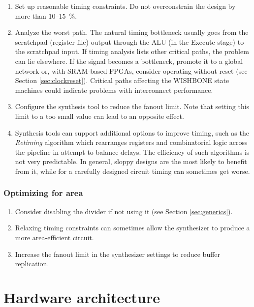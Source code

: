 \documentclass[a4paper,12pt,twoside,extrafontsizes]{memoir}
\begin{document}
\begin{enumerate}
	\item Set up reasonable timing constraints. Do not overconstrain the design by more than 10--15~\%.
	
	\item Analyze the worst path. The natural \lxp{} timing bottleneck usually goes from the scratchpad (register file) output through the ALU (in the Execute stage) to the scratchpad input. If timing analysis lists other critical paths, the problem can lie elsewhere. If the  signal becomes a bottleneck, promote it to a global network or, with SRAM-based FPGAs, consider operating without reset (see Section \ref{sec:clockreset}). Critical paths affecting the WISHBONE state machines could indicate problems with interconnect performance.
	
	\item Configure the synthesis tool to reduce the fanout limit. Note that setting this limit to a too small value can lead to an opposite effect.
	
	\item Synthesis tools can support additional options to improve timing, such as the \emph{Retiming} algorithm which rearranges registers and combinatorial logic across the pipeline in attempt to balance delays. The efficiency of such algorithms is not very predictable. In general, sloppy designs are the most likely to benefit from it, while for a carefully designed circuit timing can sometimes get worse.
\end{enumerate}

\subsection{Optimizing for area}

\begin{enumerate}
	\item Consider disabling the divider if not using it (see Section \ref{sec:generics}).
	
	\item Relaxing timing constraints can sometimes allow the synthesizer to produce a more area-efficient circuit.
	
	\item Increase the fanout limit in the synthesizer settings to reduce buffer replication.
\end{enumerate}

\chapter{Hardware architecture}
\label{ch:pipeline}
\end{document}
